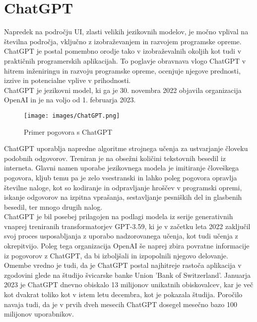 \documentclass[a4paper,12pt,openright]{book}
\begin{document}
\section{ChatGPT}
Napredek na področju UI, zlasti velikih jezikovnih modelov, je močno vplival na številna področja, vključno z izobraževanjem in razvojem programske opreme. ChatGPT je postal pomembno orodje tako v izobraževalnih okoljih kot tudi v praktičnih programerskih aplikacijah. To poglavje obravnava vlogo ChatGPT v hitrem inženiringu in razvoju programske opreme, ocenjuje njegove prednosti, izzive in potencialne vplive v prihodnosti. \\
ChatGPT je jezikovni model, ki ga je 30. novembra 2022 objavila organizacija OpenAI in je na voljo od 1. februarja 2023. \cite{openai_codex} \\
\begin{figure}[H]
    \centering
    \texttt{[image: images/ChatGPT.png]}
    \caption{Primer pogovora s ChatGPT}
    \label{fig:ChatGPT}
\end{figure}

ChatGPT uporablja napredne algoritme strojnega učenja za ustvarjanje človeku podobnih odgovorov. Treniran je na obsežni količini tekstovnih besedil iz interneta. Glavni namen uporabe jezikovnega modela je imitiranje človeškega pogovora, kljub temu pa je zelo vsestranski in lahko poleg pogovora opravlja številne naloge, kot so kodiranje in odpravljanje hroščev v programski opremi, iskanje odgovorov na izpitna vprašanja, sestavljanje pesniških del in glasbenih besedil, ter mnogo drugih nalog. \cite{tung2023chatgpt} \\
ChatGPT je bil posebej prilagojen na podlagi modela iz serije generativnih vnaprej treniranih transformatorjev GPT-3.59, ki je v začetku leta 2022 zaključil svoj proces usposabljanja z uporabo nadzorovanega učenja, kot tudi učenja z okrepitvijo. Poleg tega organizacija OpenAI še naprej zbira povratne informacije iz pogovorov z ChatGPT, da bi izboljšali in izpopolnili njegovo delovanje. Omembe vredno je tudi, da je ChatGPT postal najhitreje rastoča aplikacija v zgodovini glede na študijo švicarske banke Union 'Bank of Switzerland'. Januarja 2023 je ChatGPT dnevno obiskalo 13 milijonov unikatnih obiskovalcev, kar je več kot dvakrat toliko kot v istem letu decembra, kot je pokazala študija. Poročilo navaja tudi, da je v prvih dveh mesecih ChatGPT dosegel mesečno bazo 100 milijonov uporabnikov. \cite{yetistiren2023evaluating} \\
\end{document}
